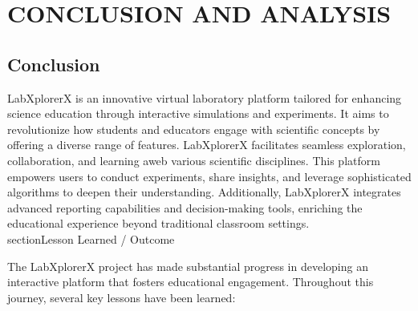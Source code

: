 \chapter{CONCLUSION AND ANALYSIS}
\section{Conclusion}
LabXplorerX is an innovative virtual laboratory platform tailored for enhancing science education through interactive simulations and experiments. It aims to revolutionize how students and educators engage with scientific concepts by offering a diverse range of features. LabXplorerX facilitates seamless exploration, collaboration, and learning aweb various scientific disciplines. This platform empowers users to conduct experiments, share insights, and leverage sophisticated algorithms to deepen their understanding. Additionally, LabXplorerX integrates advanced reporting capabilities and decision-making tools, enriching the educational experience beyond traditional classroom settings.
\\section{Lesson Learned / Outcome}

The LabXplorerX project has made substantial progress in developing an interactive platform that fosters educational engagement. Throughout this journey, several key lessons have been learned:

